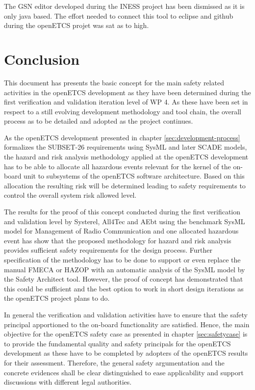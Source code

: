 \documentclass{template/openetcs_report}
\begin{document}
The GSN editor developed during the INESS project has been dismissed as it is only java based. The effort needed to connect this tool to eclipse and github during the openETCS projet was sat as to high. 
 
\chapter{Conclusion}
\label{sec:conclusion}

This document has presents the basic concept for the main safety related activities in the openETCS development as they have been determined during the first verification and validation iteration level of WP 4. As these have been set in respect to a still evolving development methodology and tool chain, the overall process as to be detailed and adopted as the project continues. 

As the openETCS development presented in chapter \ref{sec:development-process} formalizes the SUBSET-26 requirements using SysML and later SCADE models, the hazard and risk analysis methodology applied at the openETCS development has to be able to allocate all hazardous events relevant for the kernel of the on-board unit to subsystems of the openETCS software architecture. Based on this allocation the resulting risk will be determined leading to safety requirements to control the overall system risk allowed level. 

The results for the proof of this concept conducted during the first verification and validation level by Systerel, All4Tec and AEbt using the benchmark SysML model for Management of Radio Communication and one allocated hazardous event has show that the proposed methodology for hazard and risk analysis provides sufficient safety requirements for the design process. Further specification of the methodology has to be done to support or even replace the manual FMECA or HAZOP with an automatic analysis of the SysML model by the Safety Architect tool. However, the proof of concept has demonstrated that this could be sufficient and the best option to work in short design iterations as the openETCS project plans to do. 

In general the verification and validation activities have to ensure that the safety principal apportioned to the on-board functionality are satisfied. Hence, the main objective for the openETCS safety case as presented in chapter \ref{sec:safetycase} is to provide the fundamental quality and safety principals for the openETCS development as these have to be completed by adopters of the openETCS results for their assessment. Therefore, the general safety argumentation and the concrete evidences shall be clear distinguished to ease applicability and support discussions with different legal authorities.
\end{document}
